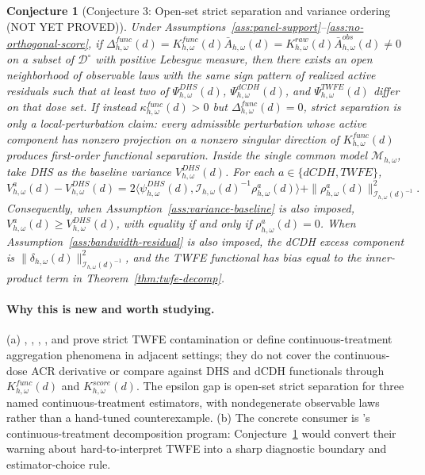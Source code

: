 \documentclass[11pt]{article}
\theoremstyle{definition}
\theoremstyle{plain}
\newtheorem{conjecture}{Conjecture}
\theoremstyle{remark}
\begin{document}
\begin{conjecture}[Conjecture 3: Open-set strict separation and variance ordering (NOT YET PROVED)]\label{conj:strict-separation}
Under Assumptions~\ref{ass:panel-support}--\ref{ass:no-orthogonal-score}, if \(\Delta^{func}_{h,\omega}(d)=K^{func}_{h,\omega}(d)\bar A_{h,\omega}(d)=K^{raw}_{h,\omega}(d)\bar A^{obs}_{h,\omega}(d)\neq 0\) on a subset of \(\mathcal D^\circ\) with positive Lebesgue measure, then there exists an open neighborhood of observable laws with the same sign pattern of realized active residuals such that at least two of \(\Psi^{DHS}_{h,\omega}(d)\), \(\Psi^{dCDH}_{h,\omega}(d)\), and \(\Psi^{TWFE}_{h,\omega}(d)\) differ on that dose set. If instead \(\kappa^{func}_{h,\omega}(d)>0\) but \(\Delta^{func}_{h,\omega}(d)=0\), strict separation is only a local-perturbation claim: every admissible perturbation whose active component has nonzero projection on a nonzero singular direction of \(K^{func}_{h,\omega}(d)\) produces first-order functional separation. Inside the single common model \(\mathcal M_{h,\omega}\), take DHS as the baseline variance \(V^{DHS}_{h,\omega}(d)\). For each \(a\in\{dCDH,TWFE\}\),
\[
  V^a_{h,\omega}(d)-V^{DHS}_{h,\omega}(d)
  =
  2\langle\psi^{DHS}_{h,\omega}(d),
    \mathcal I_{h,\omega}(d)^{-1}\rho^a_{h,\omega}(d)\rangle
  +\|\rho^a_{h,\omega}(d)\|_{\mathcal I_{h,\omega}(d)^{-1}}^2.
\]
Consequently, when Assumption~\ref{ass:variance-baseline} is also imposed, \(V^a_{h,\omega}(d)\ge V^{DHS}_{h,\omega}(d)\), with equality if and only if \(\rho^a_{h,\omega}(d)=0\). When Assumption~\ref{ass:bandwidth-residual} is also imposed, the dCDH excess component is \(\|\delta_{h,\omega}(d)\|_{\mathcal I_{h,\omega}(d)^{-1}}^2\), and the TWFE functional has bias equal to the inner-product term in Theorem~\ref{thm:twfe-decomp}.
\end{conjecture}
\paragraph{Why this is new and worth studying.}
(a) \citet{deChaisemartinDHaultfoeuille2020}, \citet{deChaisemartinDHaultfoeuille2023SeveralTreatments}, \citet{GoodmanBacon2021}, \citet{SunAbraham2021}, and \citet{CallawayGoodmanBaconSantAnna2024EventStudies} prove strict TWFE contamination or define continuous-treatment aggregation phenomena in adjacent settings; they do not cover the continuous-dose ACR derivative or compare against DHS and dCDH functionals through \(K^{func}_{h,\omega}(d)\) and \(K^{score}_{h,\omega}(d)\). The epsilon gap is open-set strict separation for three named continuous-treatment estimators, with nondegenerate observable laws rather than a hand-tuned counterexample. (b) The concrete consumer is \citet{CallawayGoodmanBaconSantAnna2024}'s continuous-treatment decomposition program: Conjecture~\ref{conj:strict-separation} would convert their warning about hard-to-interpret TWFE into a sharp diagnostic boundary and estimator-choice rule.
\end{document}
